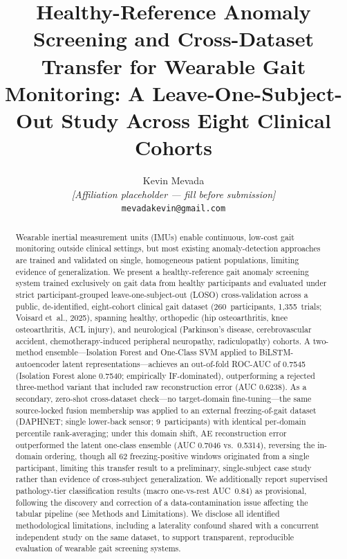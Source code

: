 \documentclass[11pt,a4paper]{article}
\title{\textbf{Healthy-Reference Anomaly Screening and Cross-Dataset Transfer for Wearable Gait Monitoring: A Leave-One-Subject-Out Study Across Eight Clinical Cohorts}}
\author{Kevin Mevada\\[0.4em]
\small\textit{[Affiliation placeholder --- fill before submission]}\\
\small\texttt{mevadakevin@gmail.com}}
\date{}
\begin{document}
\maketitle

\begin{abstract}
Wearable inertial measurement units (IMUs) enable continuous, low-cost gait monitoring outside clinical settings, but most existing anomaly-detection approaches are trained and validated on single, homogeneous patient populations, limiting evidence of generalization. We present a healthy-reference gait anomaly screening system trained exclusively on gait data from healthy participants and evaluated under strict participant-grouped leave-one-subject-out (LOSO) cross-validation across a public, de-identified, eight-cohort clinical gait dataset (260~participants, 1{,}355~trials; Voisard et~al., 2025), spanning healthy, orthopedic (hip osteoarthritis, knee osteoarthritis, ACL injury), and neurological (Parkinson's disease, cerebrovascular accident, chemotherapy-induced peripheral neuropathy, radiculopathy) cohorts. A two-method ensemble---Isolation Forest and One-Class SVM applied to BiLSTM-autoencoder latent representations---achieves an out-of-fold ROC-AUC of 0.7545 (Isolation Forest alone 0.7540; empirically IF-dominated), outperforming a rejected three-method variant that included raw reconstruction error (AUC 0.6238). As a secondary, zero-shot cross-dataset check---no target-domain fine-tuning---the same source-locked fusion membership was applied to an external freezing-of-gait dataset (DAPHNET; single lower-back sensor; 9~participants) with identical per-domain percentile rank-averaging; under this domain shift, AE reconstruction error outperformed the latent one-class ensemble (AUC 0.7046 vs.\ 0.5314), reversing the in-domain ordering, though all 62 freezing-positive windows originated from a single participant, limiting this transfer result to a preliminary, single-subject case study rather than evidence of cross-subject generalization. We additionally report supervised pathology-tier classification results (macro one-vs-rest AUC~0.84) as provisional, following the discovery and correction of a data-contamination issue affecting the tabular pipeline (see Methods and Limitations). We disclose all identified methodological limitations, including a laterality confound shared with a concurrent independent study on the same dataset, to support transparent, reproducible evaluation of wearable gait screening systems.
\end{abstract}
\end{document}
